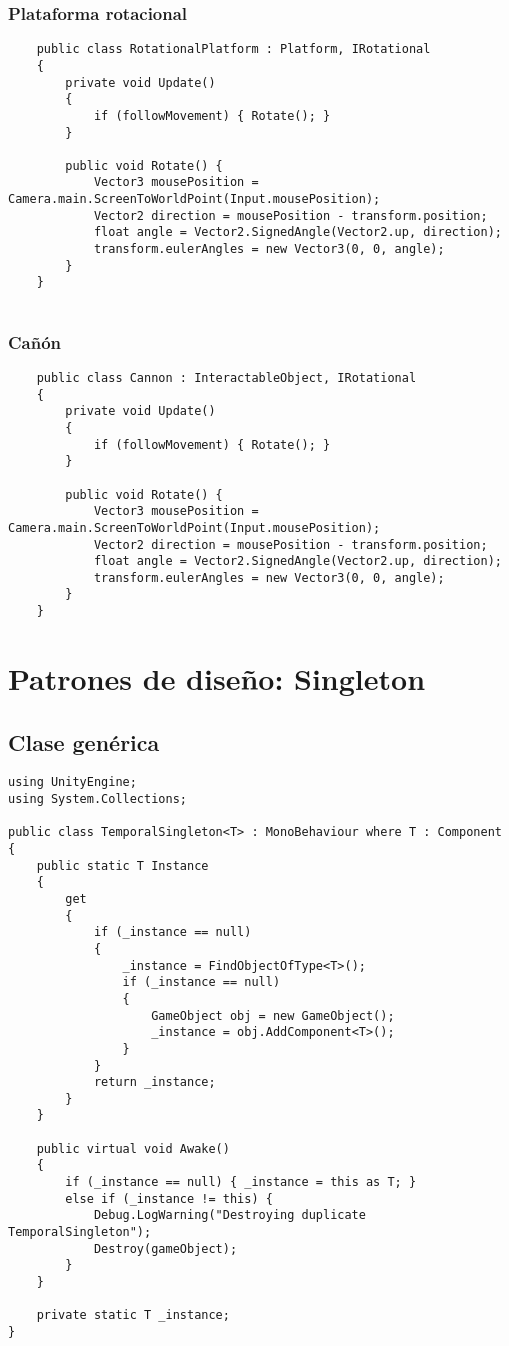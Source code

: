 \subsubsection{Plataforma rotacional}

\begin{lstlisting}
	public class RotationalPlatform : Platform, IRotational
	{
		private void Update()
		{
			if (followMovement) { Rotate(); }
		}
		
		public void Rotate() {
			Vector3 mousePosition = Camera.main.ScreenToWorldPoint(Input.mousePosition);
			Vector2 direction = mousePosition - transform.position;
			float angle = Vector2.SignedAngle(Vector2.up, direction);
			transform.eulerAngles = new Vector3(0, 0, angle);
		}
	}
	
\end{lstlisting}

\subsubsection{Cañón}

\begin{lstlisting}
	public class Cannon : InteractableObject, IRotational
	{
		private void Update()
		{
			if (followMovement) { Rotate(); }
		}
		
		public void Rotate() {
			Vector3 mousePosition = Camera.main.ScreenToWorldPoint(Input.mousePosition);
			Vector2 direction = mousePosition - transform.position;
			float angle = Vector2.SignedAngle(Vector2.up, direction);
			transform.eulerAngles = new Vector3(0, 0, angle);
		}
	}
\end{lstlisting}

\section{Patrones de diseño: Singleton} \label{code:singleton}

\subsection{Clase genérica} \label{code:generic}

\begin{lstlisting}
using UnityEngine;
using System.Collections;

public class TemporalSingleton<T> : MonoBehaviour where T : Component
{
	public static T Instance
	{
		get
		{
			if (_instance == null)
			{
				_instance = FindObjectOfType<T>();
				if (_instance == null)
				{
					GameObject obj = new GameObject();
					_instance = obj.AddComponent<T>();
				}
			}
			return _instance;
		}
	}
	
	public virtual void Awake()
	{
		if (_instance == null) { _instance = this as T;	}
		else if (_instance != this)	{ 
			Debug.LogWarning("Destroying duplicate TemporalSingleton"); 
			Destroy(gameObject);
		}
	}
	
	private static T _instance;
}
\end{lstlisting}

